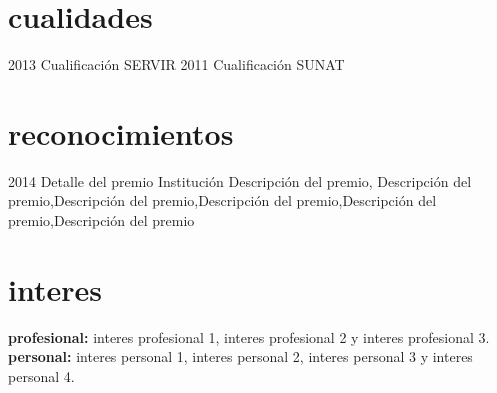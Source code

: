 \documentclass[]{cv-style}
\begin{document}

\section{cualidades}
\begin{entrylist}
\entry
{2013}
{Cualificación}
{SERVIR}
{\vspace{-0.3cm}}
\entry
{2011}
{Cualificación}
{SUNAT}
{\vspace{-0.3cm}}
\end{entrylist}


\section{reconocimientos}
\begin{entrylist}
\entry
{2014}
{Detalle del premio}
{Institución}
{Descripción del premio, Descripción del premio,Descripción del premio,Descripción del premio,Descripción del premio,Descripción del premio }
\end{entrylist}


\section{interes}
  \vspace{-0.2cm}

\textbf{profesional:} interes profesional  1, interes profesional  2 y interes profesional  3. \textbf{personal:} interes personal 1,  interes personal 2,  interes personal 3  y interes personal 4.

\end{document}
